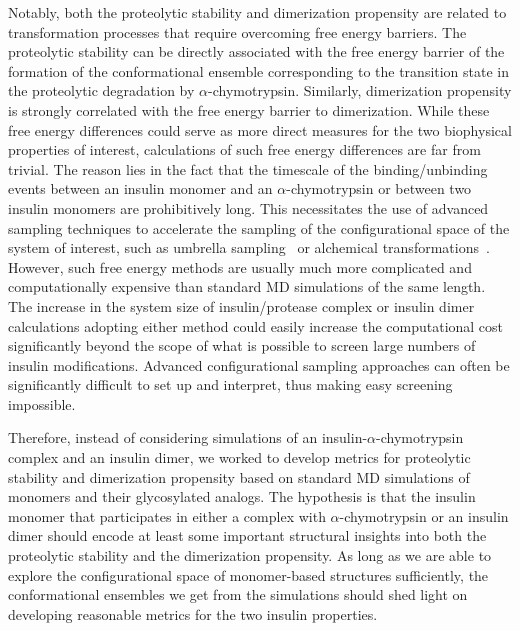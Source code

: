\documentclass[sn-vancouver]{sn-jnl}
\begin{document}
Notably, both the proteolytic stability and dimerization propensity are related to transformation processes that require overcoming free energy barriers. The proteolytic stability can be directly associated with the free energy barrier of the formation of the conformational ensemble corresponding to the transition state in the proteolytic degradation by $\alpha$-chymotrypsin. Similarly, dimerization propensity is strongly correlated with the free energy barrier to dimerization. While these free energy differences could serve as more direct measures for the two biophysical properties of interest, calculations of such free energy differences are far from trivial. The reason lies in the fact that the timescale of the binding/unbinding events between an insulin monomer and an $\alpha$-chymotrypsin or between two insulin monomers are prohibitively long. This necessitates the use of advanced sampling techniques to accelerate the sampling of the configurational space of the system of interest, such as umbrella sampling~\cite{torrie1977nonphysical} or alchemical transformations~\cite{sugita2000replica, lyubartsev1992new}. However, such free energy methods are usually much more complicated and computationally expensive than standard MD simulations of the same length. The increase in the system size of insulin/protease complex or insulin dimer calculations adopting either method could easily increase the computational cost significantly beyond the scope of what is possible to screen large numbers of insulin modifications.  Advanced configurational sampling approaches can often be significantly difficult to set up and interpret, thus making easy screening impossible.

Therefore, instead of considering simulations of an insulin-$\alpha$-chymotrypsin complex and an insulin dimer, we worked to develop metrics for proteolytic stability and dimerization propensity based on standard MD simulations of monomers and their glycosylated analogs. The hypothesis is that the insulin monomer that participates in either a complex with $\alpha$-chymotrypsin or an insulin dimer should encode at least some important structural insights into both the proteolytic stability and the dimerization propensity. As long as we are able to explore the configurational space of monomer-based structures sufficiently, the conformational ensembles we get from the simulations should shed light on developing reasonable metrics for the two insulin properties. 
\end{document}
